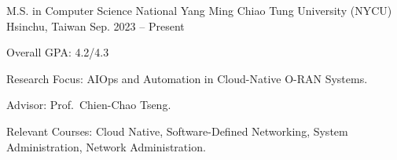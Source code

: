 

\begin{cventries}

  \cventry
    {M.S. in Computer Science} %
    {National Yang Ming Chiao Tung University (NYCU)} %
    {Hsinchu, Taiwan} %
    {Sep. 2023 -- Present} %
    {
      \begin{cvitems} %
        \item {Overall GPA: 4.2/4.3}
        \item {Research Focus: AIOps and Automation in Cloud-Native O-RAN Systems.}
        \item {Advisor: Prof.~Chien-Chao Tseng.}
        \item {Relevant Courses: Cloud Native, Software-Defined Networking, System Administration, Network Administration.}
      \end{cvitems}
    }

\end{cventries}
